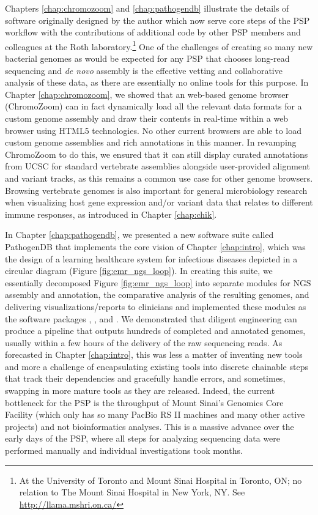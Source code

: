 Chapters \ref{chap:chromozoom} and \ref{chap:pathogendb} illustrate the details of software originally designed by the author which now serve core steps of the PSP workflow with the contributions of additional code by other PSP members and colleagues at the Roth laboratory.\footnote{At the University of Toronto and Mount Sinai Hospital in Toronto, ON; no relation to The Mount Sinai Hospital in New York, NY. See \url{http://llama.mshri.on.ca/}} One of the challenges of creating so many new bacterial genomes as would be expected for any PSP that chooses long-read sequencing and \emph{de novo} assembly is the effective vetting and collaborative analysis of these data, as there are essentially no online tools for this purpose. In Chapter \ref{chap:chromozoom}, we showed that an web-based genome browser (ChromoZoom) can in fact dynamically load all the relevant data formats for a custom genome assembly and draw their contents in real-time within a web browser using HTML5 technologies. No other current browsers are able to load custom genome assemblies and rich annotations in this manner. In revamping ChromoZoom to do this, we ensured that it can still display curated annotations from UCSC for standard vertebrate assemblies alongside user-provided alignment and variant tracks, as this remains a common use case for other genome browsers. Browsing vertebrate genomes is also important for general microbiology research when visualizing host gene expression and/or variant data that relates to different immune responses, as introduced in Chapter \ref{chap:chik}.

In Chapter \ref{chap:pathogendb}, we presented a new software suite called PathogenDB that implements the core vision of Chapter \ref{chap:intro}, which was the design of a learning healthcare system for infectious diseases depicted in a circular diagram (Figure \ref{fig:emr_ngs_loop}). In creating this suite, we essentially decomposed Figure \ref{fig:emr_ngs_loop} into separate modules for NGS assembly and annotation, the comparative analysis of the resulting genomes, and delivering visualizations/reports to clinicians and implemented these modules as the software packages \pathogendbpipeline, \pathogendbcomparison, and \pathogendbviz. We demonstrated that diligent engineering can produce a pipeline that outputs hundreds of completed and annotated genomes, usually within a few hours of the delivery of the raw sequencing reads. As forecasted in Chapter \ref{chap:intro}, this was less a matter of inventing new tools and more a challenge of encapsulating existing tools into discrete chainable steps that track their dependencies and gracefully handle errors, and sometimes, swapping in more mature tools as they are released.\autocite{Seemann2014,Hunt2015} Indeed, the current bottleneck for the PSP is the throughput of Mount Sinai's Genomics Core Facility (which only has so many PacBio RS II machines and many other active projects) and not bioinformatics analyses. This is a massive advance over the early days of the PSP, where all steps for analyzing sequencing data were performed manually and individual investigations took months.

